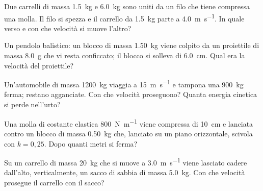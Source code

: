 \begin{esercizio}
Due carrelli di massa \SI{1,5}{\kilo\gram} e \SI{6,0}{\kilo\gram} sono uniti da un filo che tiene compressa una molla. Il filo si spezza e il carrello da \SI{1,5}{\kilo\gram} parte a \SI{4,0}{\metre\per\second}. In quale verso e con che velocità si muove l'altro?\\
\end{esercizio}

\begin{esercizio}
Un pendolo balistico: un blocco di massa \SI{1,50}{\kilo\gram} viene colpito da un proiettile di massa \SI{8,0}{\gram} che vi resta conficcato; il blocco si solleva di \SI{6,0}{\centi\metre}. Qual era la velocità del proiettile?\\
\end{esercizio}

\begin{esercizio}
Un'automobile di massa \SI{1200}{\kilo\gram} viaggia a \SI{15}{\metre\per\second} e tampona una \SI{900}{\kilo\gram} ferma; restano agganciate. Con che velocità proseguono? Quanta energia cinetica si perde nell'urto?\\
\end{esercizio}

\begin{esercizio}
Una molla di costante elastica \SI{800}{\newton\per\metre} viene compressa di \SI{10}{\centi\metre} e lanciata contro un blocco di massa \SI{0,50}{\kilo\gram} che, lanciato su un piano orizzontale, scivola con $k = 0{,}25$. Dopo quanti metri si ferma?\\
\end{esercizio}

\begin{esercizio}
Su un carrello di massa \SI{20}{\kilo\gram} che si muove a \SI{3,0}{\metre\per\second} viene lasciato cadere dall'alto, verticalmente, un sacco di sabbia di massa \SI{5,0}{\kilo\gram}. Con che velocità prosegue il carrello con il sacco?\\
\end{esercizio}

